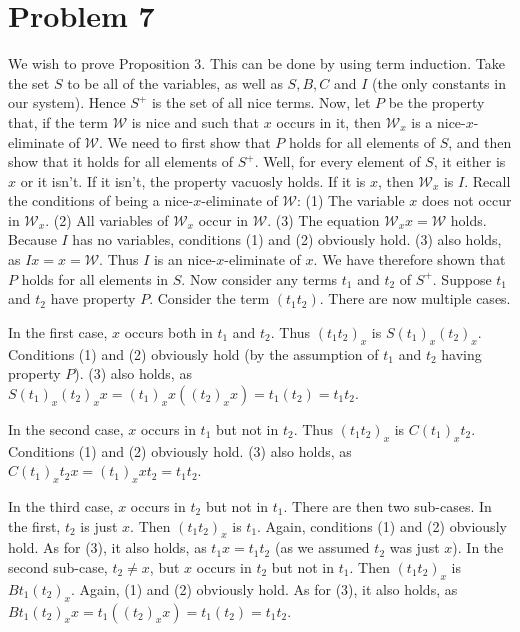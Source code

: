\documentclass{article}
\theoremstyle{definition}
\begin{document}
\section*{Problem 7}
We wish to prove Proposition 3. This can be done by using term induction. Take the set $S$ to be all of the variables, as well as $S,B,C$ and $I$ (the only constants in 
our system). Hence $S^+$ is the set of all nice terms. Now, let $P$ be the property that, if the term $\mathcal{W}$ is nice and such that $x$ occurs in it, then 
$\mathcal{W}_x$ is a nice-$x$-eliminate of $\mathcal{W}$. We need to first show that $P$ holds for all elements of $S$, and then show that it holds for all elements of 
$S^+$. Well, for every element of $S$, it either is $x$ or it 
isn't. If it isn't, the property vacuosly holds. If it is $x$, then $\mathcal{W}_x$ is $I$. Recall the conditions of being a nice-$x$-eliminate of $\mathcal{W}$:\newline
(1) The variable $x$ does not occur in $\mathcal{W}_x$.\newline
(2) All variables of $\mathcal{W}_x$ occur in $\mathcal{W}$.\newline
(3) The equation $\mathcal{W}_xx=\mathcal{W}$ holds.\newline
Because $I$ has no variables, conditions (1) and (2) obviously hold. (3) also holds, as $Ix=x=\mathcal{W}$. Thus $I$ is an nice-$x$-eliminate of 
$x$. We have therefore shown that $P$ holds for all elements in $S$. Now consider any terms $t_1$ and $t_2$ of $S^+$. Suppose $t_1$ and $t_2$ have property $P$. 
Consider the term $(t_1t_2)$. There are now multiple cases.


In the first case, $x$ occurs both in $t_1$ and $t_2$. Thus $(t_1t_2)_x$ is $S(t_1)_x(t_2)_x$. Conditions (1) and (2) obviously hold (by the assumption of 
$t_1$ and $t_2$ having property $P$). (3) also holds, as $S(t_1)_x(t_2)_xx=(t_1)_xx((t_2)_xx)=t_1(t_2)=t_1t_2$.


In the second case, $x$ occurs in $t_1$ but not in $t_2$. Thus $(t_1t_2)_x$ is $C(t_1)_xt_2$. Conditions (1) and (2) obviously hold. (3) also holds, as 
$C(t_1)_xt_2x=(t_1)_xxt_2=t_1t_2$.


In the third case, $x$ occurs in $t_2$ but not in $t_1$. There are then two sub-cases. In the first, $t_2$ is just $x$. Then $(t_1t_2)_x$ is $t_1$. 
Again, conditions (1) and (2) obviously hold. As for (3), it also holds, as $t_1x=t_1t_2$ (as we assumed $t_2$ was just $x$). In the second sub-case, 
$t_2\ne x$, but $x$ occurs in $t_2$ but not in $t_1$. Then $(t_1t_2)_x$ is $Bt_1(t_2)_x$. Again, (1) and (2) obviously hold. As for (3), it also holds, as
$Bt_1(t_2)_xx=t_1((t_2)_xx)=t_1(t_2)=t_1t_2$.
\end{document}
